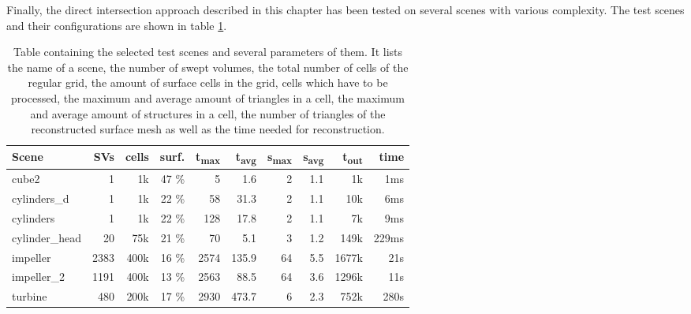 Finally, the direct intersection approach described in this chapter has been tested on several scenes with various complexity.
The test scenes and their configurations are shown in table \ref{tbl:test_scenes}.
%
\begin{table}[h]
	\centering
	\begin{tabular}{lrrrrrrrrr}
		Scene          & SVs  & cells & surf. & t\textsubscript{max} & t\textsubscript{avg} & s\textsubscript{max} & s\textsubscript{avg} & t\textsubscript{out} & time \\
		\hline
		cube2          &    1 &   1k & 47 \% &    5 &   1.6 &  2 & 1.1 &    1k &   1ms \\
		cylinders\_d   &    1 &   1k & 22 \% &   58 &  31.3 &  2 & 1.1 &   10k &   6ms \\
		cylinders      &    1 &   1k & 22 \% &  128 &  17.8 &  2 & 1.1 &    7k &   9ms \\
		cylinder\_head &   20 &  75k & 21 \% &   70 &   5.1 &  3 & 1.2 &  149k & 229ms \\
		impeller       & 2383 & 400k & 16 \% & 2574 & 135.9 & 64 & 5.5 & 1677k &  21s  \\
		impeller\_2    & 1191 & 400k & 13 \% & 2563 &  88.5 & 64 & 3.6 & 1296k &  11s  \\
		turbine        &  480 & 200k & 17 \% & 2930 & 473.7 &  6 & 2.3 &  752k & 280s  \\
	\end{tabular}
	\caption{
		Table containing the selected test scenes and several parameters of them.
		It lists the name of a scene, the number of swept volumes, the total number of cells of the regular grid, the amount of surface cells in the grid, \ie cells which have to be processed, the maximum and average amount of triangles in a cell, the maximum and average amount of structures in a cell, the number of triangles of the reconstructed surface mesh as well as the time needed for reconstruction.
	}
	\label{tbl:test_scenes}
\end{table}
%
